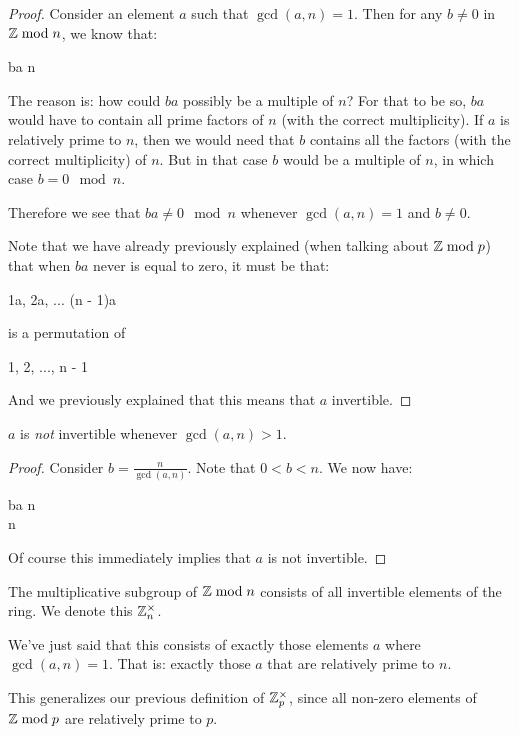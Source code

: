 \begin{proof}
  Consider an element $a$ such that $\gcd(a, n) = 1$. Then for any $b
  \ne 0$ in $\mathbb{Z} \bmod n$, we know that:

    \begin{nedqn}
      ba
     \mod n
    \end{nedqn}

  The reason is: how could $ba$ possibly be a multiple of $n$? For that
  to be so, $ba$ would have to contain all prime factors of $n$ (with
  the correct multiplicity). If $a$ is relatively prime to $n$, then we
  would need that $b$ contains all the factors (with the correct
  multiplicity) of $n$. But in that case $b$ would be a multiple of $n$,
  in which case $b = 0 \mod n$.

  Therefore we see that $ba \ne 0 \mod n$ whenever $\gcd(a, n) = 1$ and
  $b \ne 0$.

  Note that we have already previously explained (when talking about
  $\mathbb{Z} \bmod p$) that when $ba$ never is equal to zero, it must be that:

  \begin{nedqn}
    1a, 2a, ... (n - 1)a
  \end{nedqn}

  is a permutation of

  \begin{nedqn}
    1, 2, ..., n - 1
  \end{nedqn}

  And we previously explained that this means that $a$ invertible.
\end{proof}

\begin{lemma}
  $a$ is \emph{not} invertible whenever $\gcd(a, n) > 1$.
\end{lemma}

\begin{proof}
  Consider $b = \frac{n}{\gcd(a, n)}$. Note that $0 < b < n$. We now
  have:

  \begin{nedqn}
    ba
  \eqcol
    n
  \\
   \mod n
  \end{nedqn}

  Of course this immediately implies that $a$ is not invertible.
\end{proof}

\begin{definition}
  The multiplicative subgroup of $\mathbb{Z} \bmod n$ consists of all invertible
  elements of the ring. We denote this $\mathbb{Z}_n^\times$.

  We've just said that this consists of exactly those elements $a$ where
  $\gcd(a, n) = 1$. That is: exactly those $a$ that are relatively prime
  to $n$.

  This generalizes our previous definition of $\mathbb{Z}_p^\times$, since all
  non-zero elements of $\mathbb{Z} \bmod p$ are relatively prime to $p$.
\end{definition}

